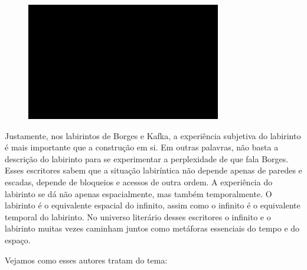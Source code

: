 \begin{figure}[!ht]
\centering
 \includegraphics[width=85mm]{./imgs/im1.jpg}
\caption{\tiny{}}
\end{figure}

Justamente, nos labirintos de Borges e Kafka, a experiência subjetiva do
labirinto é mais importante que a construção em si. Em outras palavras,
não basta a descrição do labirinto para se experimentar a perplexidade
de que fala Borges. Esses escritores sabem que a situação labiríntica
não depende apenas de paredes e escadas, depende de bloqueios e acessos
de outra ordem. A experiência do labirinto se dá não apenas
espacialmente, mas também temporalmente. O labirinto é o equivalente
espacial do infinito, assim como o infinito é o equivalente temporal do
labirinto. No universo literário desses escritores o infinito e o
labirinto muitas vezes caminham juntos como metáforas essenciais do
tempo e do espaço.

Vejamos como esses autores tratam do tema:

